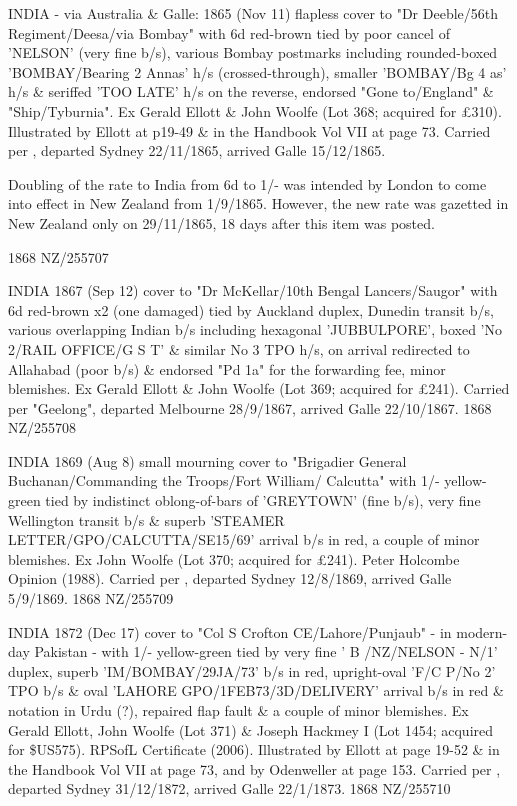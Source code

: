 \documentclass[justified]{tufte-book}
\begin{document}
%
{INDIA - via Australia \& Galle: 1865 (Nov 11) flapless cover to "Dr Deeble/56th Regiment/Deesa/via Bombay" with 6d red-brown tied by poor cancel of 'NELSON' (very fine b/s), various Bombay postmarks including rounded-boxed 'BOMBAY/Bearing 2 Annas' h/s (crossed-through), smaller 'BOMBAY/Bg 4 as' h/s \& seriffed 'TOO LATE' h/s on the reverse, endorsed "Gone to/England" \& "Ship/Tyburnia". Ex Gerald Ellott \& John Woolfe (Lot 368; acquired for £310). Illustrated by Ellott at p19-49 \& in the Handbook Vol VII at page 73. Carried per , departed Sydney 22/11/1865, arrived Galle 15/12/1865. 

Doubling of the rate to India from 6d to 1/- was intended by London to come into effect in New Zealand from 1/9/1865. However, the new rate was gazetted in New Zealand only on 29/11/1865, 18 days after this item was posted.}%
{1868}%
{NZ/255707}%
{}%
{}
{}%
{}

%
{INDIA 1867 (Sep 12) cover to "Dr McKellar/10th Bengal Lancers/Saugor" with 6d red-brown x2 (one damaged) tied by Auckland duplex, Dunedin transit b/s, various overlapping Indian b/s including hexagonal 'JUBBULPORE', boxed 'No 2/RAIL OFFICE/G S T' \& similar No 3 TPO h/s, on arrival redirected to Allahabad (poor b/s) \& endorsed "Pd 1a" for the forwarding fee, minor blemishes. Ex Gerald Ellott \& John Woolfe (Lot 369; acquired for £241). Carried per "Geelong", departed Melbourne 28/9/1867, arrived Galle 22/10/1867.}%
{1868}%
{NZ/255708}%
{}%
{}
{}%
{}

%
{INDIA 1869 (Aug 8) small mourning cover to "Brigadier General Buchanan/Commanding the Troops/Fort William/ Calcutta" with 1/- yellow-green tied by indistinct oblong-of-bars of 'GREYTOWN' (fine b/s), very fine Wellington transit b/s \& superb 'STEAMER LETTER/GPO/CALCUTTA/SE15/69' arrival b/s in red, a couple of minor blemishes. Ex John Woolfe (Lot 370; acquired for £241). Peter Holcombe Opinion (1988). Carried per , departed Sydney 12/8/1869, arrived Galle 5/9/1869.}%
{1868}%
{NZ/255709}%
{}%
{}
{}%
{}

%
{INDIA 1872 (Dec 17) cover to "Col S Crofton CE/Lahore/Punjaub" - in modern-day Pakistan - with 1/- yellow-green tied by very fine ' B /NZ/NELSON - N/1' duplex, superb 'IM/BOMBAY/29JA/73' b/s in red, upright-oval 'F/C P/No 2' TPO b/s \& oval 'LAHORE GPO/1FEB73/3D/DELIVERY' arrival b/s in red \& notation in Urdu (?), repaired flap fault \& a couple of minor blemishes. Ex Gerald Ellott, John Woolfe (Lot 371) \& Joseph Hackmey I (Lot 1454; acquired for \$US575). RPSofL Certificate (2006). Illustrated by Ellott at page 19-52 \& in the Handbook Vol VII at page 73, and by Odenweller at page 153. Carried per , departed Sydney 31/12/1872, arrived Galle 22/1/1873.}%
{1868}%
{NZ/255710}%
{}%
{}
{}%
{}
\end{document}
